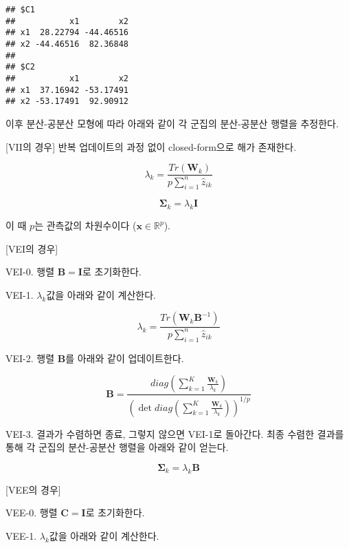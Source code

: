 \documentclass[]{book}
\begin{document}
\begin{verbatim}
## $C1
##           x1        x2
## x1  28.22794 -44.46516
## x2 -44.46516  82.36848
## 
## $C2
##           x1        x2
## x1  37.16942 -53.17491
## x2 -53.17491  92.90912
\end{verbatim}

이후 분산-공분산 모형에 따라 아래와 같이 각 군집의 분산-공분산 행렬을 추정한다.

{[}VII의 경우{]} 반복 업데이트의 과정 없이 closed-form으로 해가 존재한다.

\begin{equation*}
\lambda_k = \frac{Tr(\mathbf{W}_k)}{p \sum_{i = 1}^{n} \hat{z}_{ik}}
\end{equation*}

\begin{equation*}
\boldsymbol\Sigma_k = \lambda_k \mathbf{I}
\end{equation*}

이 때 \(p\)는 관측값의 차원수이다 (\(\mathbf{x} \in \mathbb{R}^p\)).

{[}VEI의 경우{]}

VEI-0. 행렬 \(\mathbf{B} = \mathbf{I}\)로 초기화한다.

VEI-1. \(\lambda_k\)값을 아래와 같이 계산한다.

\begin{equation*}
\lambda_k = \frac{Tr(\mathbf{W}_k \mathbf{B}^{-1})}{p \sum_{i = 1}^{n} \hat{z}_{ik}}
\end{equation*}

VEI-2. 행렬 \(\mathbf{B}\)를 아래와 같이 업데이트한다.

\begin{equation*}
\mathbf{B} = \frac{diag\left( \sum_{k = 1}^{K} \frac{\mathbf{W}_k}{\lambda_k} \right)}{\left( \det diag\left( \sum_{k = 1}^{K} \frac{\mathbf{W}_k}{\lambda_k} \right) \right)^{1 / p}}
\end{equation*}

VEI-3. 결과가 수렴하면 종료, 그렇지 않으면 VEI-1로 돌아간다. 최종 수렴한 결과를 통해 각 군집의 분산-공분산 행렬을 아래와 같이 얻는다.

\begin{equation*}
\boldsymbol\Sigma_k = \lambda_k \mathbf{B}
\end{equation*}

{[}VEE의 경우{]}

VEE-0. 행렬 \(\mathbf{C} = \mathbf{I}\)로 초기화한다.

VEE-1. \(\lambda_k\)값을 아래와 같이 계산한다.
\end{document}
